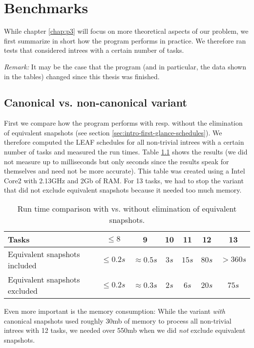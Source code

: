 \chapter{Benchmarks}
\label{chap:benchmarks}

While chapter \ref{chap:p3} will focus on more theoretical aspects of our problem, we first summarize in short how the program performs in practice. We therefore ran tests that considered intrees with a certain number of tasks.

\emph{Remark:} It may be the case that the program (and in particular, the data shown in the tables) changed since this thesis was finished.

\section{Canonical vs. non-canonical variant}
\label{sec:benchmark-canonical-vs-non-canonical}

First we compare how the program performs with resp. without the elimination of equivalent snapshots (see section \ref{sec:intro-first-glance-schedules}). We therefore computed the LEAF schedules for all non-trivial intrees with a certain number of tasks and measured the run times. Table \ref{tab:comparison-canonical-vs-non-canonical} shows the results (we did not measure up to milliseconds but only seconds since the results speak for themselves and need not be more accurate). This table was created using a Intel Core2 with 2.13GHz and 2Gb of RAM. For 13 tasks, we had to stop the variant that did not exclude equivalent snapshots because it needed too much memory. 

\begin{table}[th]
  \centering
  \begin{tabular}[ht]{lcccccc}
    Tasks                         & $\leq 8$    & 9 & 10 & 11 & 12 & 13 \\
    \hline
    Equivalent snapshots included & $\leq 0.2s$ & $\approx 0.5s$ & $3s$ & $15s$ & $80s$ & $>360s$ \\
    Equivalent snapshots excluded & $\leq 0.2s$ & $\approx 0.3s$ & $2s$ & $6s$ & $20s$ & $75s$
  \end{tabular}
  \caption{Run time comparison with vs. without elimination of equivalent snapshots.}
  \label{tab:comparison-canonical-vs-non-canonical}
\end{table}

Even more important is the memory consumption: While the variant \emph{with} canonical snapshots used roughly 30mb of memory to process all non-trivial intrees with 12 tasks, we needed over 550mb when we did \emph{not} exclude equivalent snapshots.

